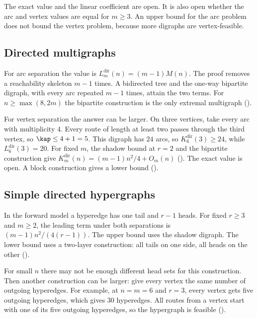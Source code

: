 The exact value and the linear coefficient are open.
It is also open whether the arc and vertex values are equal for $m\ge3$.
An upper bound for the arc problem does not bound the vertex problem, because more digraphs are vertex-feasible.

\subsection{Directed multigraphs}
\label{sec:status-directed-multigraph}

For arc separation the value is $L_m^{\mathrm{dir}}(n)=(m-1)M(n)$.
The proof removes a reachability skeleton $m-1$ times.
A bidirected tree and the one-way bipartite digraph, with every arc repeated $m-1$ times, attain the two terms.
For $n\ge\max(8,2m)$ the bipartite construction is the only extremal multigraph ().

For vertex separation the answer can be larger.
On three vertices, take every arc with multiplicity $4$.
Every route of length at least two passes through the third vertex, so $\kap\le4+1=5$.
This digraph has $24$ arcs, so $K_6^{\mathrm{dir}}(3)\ge24$, while $L_6^{\mathrm{dir}}(3)=20$.
For fixed $m$, the shadow bound at $r=2$ and the bipartite construction give $K_m^{\mathrm{dir}}(n)=(m-1)n^2/4+O_m(n)$ ().
The exact value is open. A block construction gives a lower bound ().



\subsection{Simple directed hypergraphs}
\label{sec:status-directed-simple-hypergraph}

In the forward model a hyperedge has one tail and $r-1$ heads.
For fixed $r\ge3$ and $m\ge2$, the leading term under both separations is $(m-1)n^2/(4(r-1))$.
The upper bound uses the shadow digraph.
The lower bound uses a two-layer construction: all tails on one side, all heads on the other ().

For small $n$ there may not be enough different head sets for this construction.
Then another construction can be larger: give every vertex the same number of outgoing hyperedges.
For example, at $n=m=6$ and $r=3$, every vertex gets five outgoing hyperedges, which gives $30$ hyperedges.
All routes from a vertex start with one of its five outgoing hyperedges, so the hypergraph is feasible ().


